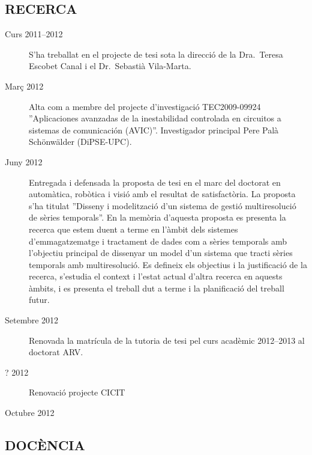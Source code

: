 \subsection*{RECERCA}

\begin{description}

\item[Curs 2011--2012] S'ha treballat en el projecte de tesi sota la
  direcció de la Dra.\ Teresa Escobet Canal i el Dr.\ Sebastià
  Vila-Marta.

\item[Març 2012] Alta com a membre del projecte d'investigació
  TEC2009-09924 ''Aplicaciones avanzadas de la inestabilidad
  controlada en circuitos a sistemas de comunicación
  (AVIC)''. Investigador principal Pere Palà Schönwälder (DiPSE-UPC).

\item[Juny 2012] Entregada i defensada la proposta de tesi en el marc
  del doctorat en automàtica, robòtica i visió amb el resultat de
  satisfactòria. La proposta s'ha titulat ''Disseny i modelització
  d'un sistema de gestió multiresolució de sèries temporals''. En la
  memòria d'aquesta proposta es presenta la recerca que estem duent a
  terme en l'àmbit dels sistemes d'emmagatzematge i tractament de
  dades com a sèries temporals amb l'objectiu principal de dissenyar
  un model d'un sistema que tracti sèries temporals amb
  multiresolució. Es defineix els objectius i la justificació de la
  recerca, s'estudia el context i l'estat actual d'altra recerca en
  aquests àmbits, i es presenta el treball dut a terme i la
  planificació del treball futur.

\item[Setembre 2012] Renovada la matrícula de la tutoria de tesi pel
  curs acadèmic 2012--2013 al doctorat ARV.

\item[? 2012] Renovació projecte CICIT 

\item[Octubre 2012] 



\end{description}



\subsection*{DOCÈNCIA}

